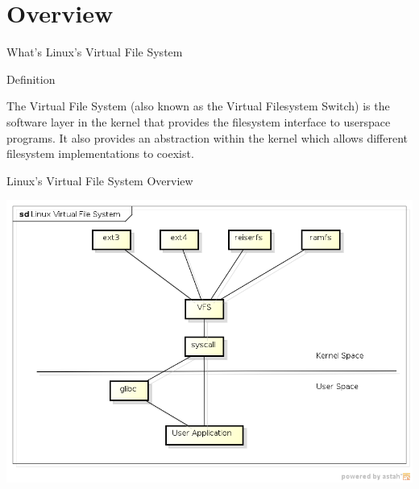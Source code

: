 \documentclass{beamer}
\begin{document}
\section{Overview}

\begin{frame}{What's Linux's Virtual File System}

  \begin{block}{Definition}

	The Virtual File System (also known as the Virtual Filesystem Switch)
	is the software layer in the kernel that provides the filesystem
	interface to userspace programs. It also provides an abstraction
	within the kernel which allows different filesystem implementations to
	coexist. \footnotemark[1]

  \end{block}


\end{frame}

\begin{frame}{Linux's Virtual File System Overview}

	\includegraphics[scale=0.5]{img/vfs_overview.png}

\end{frame}
\end{document}
